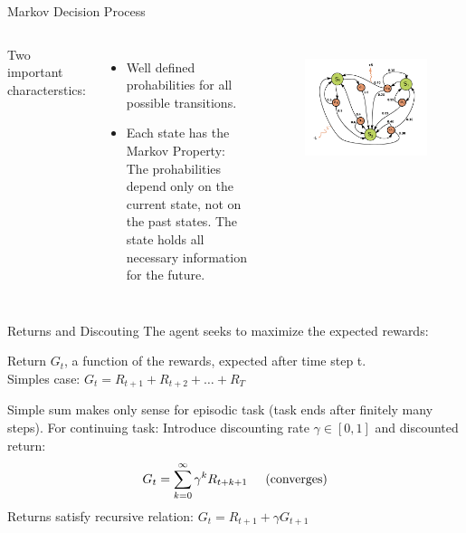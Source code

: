 \documentclass{beamer}
\begin{document}
\begin{frame}{Markov Decision Process}

	\begin{columns}
	Two important characterstics:
	\begin{itemize}
	\item Well defined prohabilities for all possible transitions.
	\item Each state has the Markov Property: The prohabilities depend only on the current state, not on the past states. The state holds all necessary information for the future.
	\end{itemize}	
	\begin{figure}
	\centering
	\includegraphics[width=\linewidth]{Images/Markov_Decision_Process.pdf}\\
	\end{figure}
	\end{columns}

\end{frame}

\begin{frame}{Returns and Discouting}
	The agent seeks to maximize the expected rewards: \\
	\begin{alertblock}{Return}
	$G_t$, a function of the rewards, expected after time step t.\\
	Simples case: $G_t = R_{t+1} + R_{t+2} + \dots + R_T$
	\end{alertblock}
	Simple sum makes only sense for episodic task (task ends after finitely many steps).
	For continuing task: Introduce discounting rate $\gamma \in [0,1]$ and discounted return:\\ 
	\begin{equation*}
	G_t = \sum_{k=0}^{\infty} \gamma^k R_{t+k+1} \hspace{0.5cm} \text{(converges)}
	\end{equation*}
	Returns satisfy recursive relation: $G_t = R_{t+1} + \gamma G_{t+1}$ \\
\end{frame}
\end{document}
